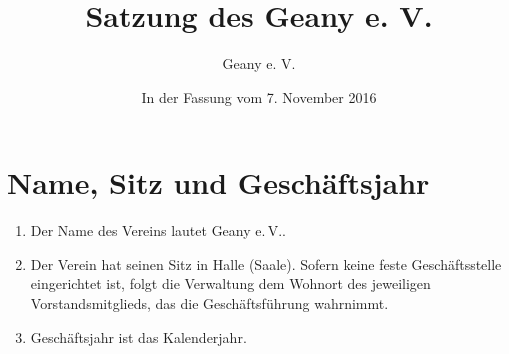 \documentclass[fontsize=12pt,paper=a4,pagesize,headings=small]{scrartcl}
\title{Satzung des Geany e. V.}
\author{Geany e. V.}
\date{In der Fassung vom 7. November 2016}
\begin{document}
\maketitle{}

\section{Name, Sitz und Geschäftsjahr}
\begin{enumerate}
    \item Der Name des Vereins lautet Geany e.\,V..

    \item Der Verein hat seinen Sitz in Halle (Saale). Sofern keine
    feste Geschäftsstelle eingerichtet ist, folgt die Verwaltung dem
    Wohnort des jeweiligen Vorstandsmitglieds, das die Geschäftsführung
    wahrnimmt.

    \item Geschäftsjahr ist das Kalenderjahr.
\end{enumerate}
\end{document}

